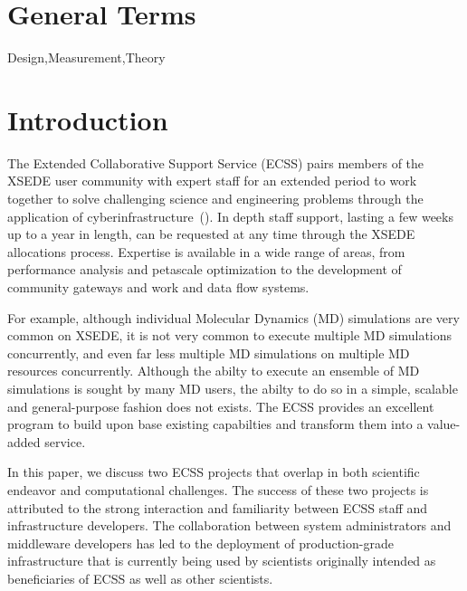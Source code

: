 \documentclass{sig-alternate}
\begin{document}

\section*{General Terms}{Design,Measurement,Theory}


\section{Introduction}



The Extended Collaborative Support Service (ECSS) pairs members of the XSEDE
user community with expert staff for an extended period to work together to
solve challenging science and engineering problems through the application of
cyberinfrastructure~(\cite{ECSS_webpage}). In depth staff support, lasting a few
weeks up to a year in length, can be requested at any time through the XSEDE
allocations process. Expertise is available in a wide range of areas, from
performance analysis and petascale optimization to the development of community
gateways and work and data flow systems.

For example, although individual Molecular Dynamics (MD) simulations
are very common on XSEDE, it is not very common to execute multiple MD
simulations concurrently, and even far less multiple MD simulations on
multiple MD resources concurrently. Although the abilty to execute an
ensemble of MD simulations is sought by many MD users, the abilty to
do so in a simple, scalable and general-purpose fashion does not
exists.  The ECSS provides an excellent program to build upon base
existing capabilties and transform them into a value-added service.

In this paper, we discuss two ECSS projects that overlap in both
scientific endeavor and computational challenges. The success of these
two projects is attributed to the strong interaction and familiarity
between ECSS staff and infrastructure developers. The collaboration
between system administrators and middleware developers has led to the
deployment of production-grade infrastructure that is currently being
used by scientists originally intended as beneficiaries of ECSS as well
as other scientists.
\end{document}

